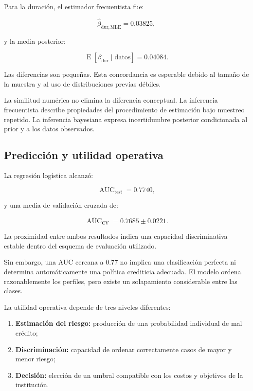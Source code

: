 Para la duración, el estimador frecuentista fue:

\[
\widehat{\beta}_{\mathrm{dur,MLE}}
=
0.03825,
\]

y la media posterior:

\[
\operatorname{E}
\left[
    \beta_{\mathrm{dur}}
    \mid
    \mathrm{datos}
\right]
=
0.04084.
\]

Las diferencias son pequeñas. Esta concordancia es esperable debido al
tamaño de la muestra y al uso de distribuciones previas débiles.

La similitud numérica no elimina la diferencia conceptual. La inferencia
frecuentista describe propiedades del procedimiento de estimación bajo
muestreo repetido. La inferencia bayesiana expresa incertidumbre
posterior condicionada al prior y a los datos observados.

\subsection{Predicción y utilidad operativa}

La regresión logística alcanzó:

\[
\operatorname{AUC}_{\mathrm{test}}
=
0.7740,
\]

y una media de validación cruzada de:

\[
\overline{\operatorname{AUC}}_{\mathrm{CV}}
=
0.7685
\pm
0.0221.
\]

La proximidad entre ambos resultados indica una capacidad discriminativa
estable dentro del esquema de evaluación utilizado.

Sin embargo, una AUC cercana a \(0.77\) no implica una clasificación
perfecta ni determina automáticamente una política crediticia adecuada.
El modelo ordena razonablemente los perfiles, pero existe un solapamiento
considerable entre las clases.

La utilidad operativa depende de tres niveles diferentes:

\begin{enumerate}
    \item \textbf{Estimación del riesgo:} producción de una probabilidad
    individual de mal crédito;

    \item \textbf{Discriminación:} capacidad de ordenar correctamente
    casos de mayor y menor riesgo;

    \item \textbf{Decisión:} elección de un umbral compatible con los
    costos y objetivos de la institución.
\end{enumerate}

